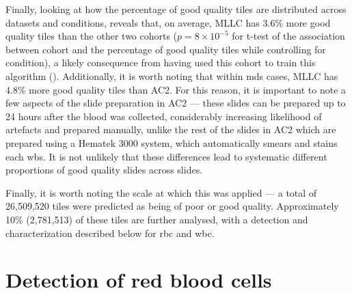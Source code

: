 \begin{figure}[!ht]
    \label{fig:sharpness-distribution}
\end{figure}

Finally, looking at how the percentage of good quality tiles are distributed across datasets and conditions, reveals that, on average, MLLC has 3.6\% more good quality tiles than the other two cohorts ($p = 8 \times 10^{-5}$ for t-test of the association between cohort and the percentage of good quality tiles while controlling for condition), a likely consequence from having used this cohort to train this algorithm (). Additionally, it is worth noting that within \ac{mds} cases, MLLC has 4.8\% more good quality tiles than AC2. For this reason, it is important to note a few aspects of the slide preparation in AC2 --- these slides can be prepared up to 24 hours after the blood was collected, considerably increasing likelihood of artefacts \cite{Bain2005-zg,Narasimha2008-fh} and prepared manually, unlike the rest of the slides in AC2 which are prepared using a Hematek 3000 system, which automatically smears and stains each \ac{wbs}. It is not unlikely that these differences lead to systematic different proportions of good quality slides across slides.

\begin{figure}[!ht]
    \label{fig:quality-percentage-distribution}
\end{figure}

Finally, it is worth noting the scale at which this was applied --- a total of 26,509,520 tiles were predicted as being of poor or good quality. Approximately 10\% (2,781,513) of these tiles are further analysed, with a detection and characterization described below for \ac{rbc} and \ac{wbc}.

\section{Detection of red blood cells}

